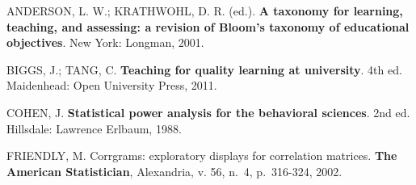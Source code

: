 \documentclass[
  12pt,
  a4paper,
  twoside,
  brazilian
]{article}
\begin{document}
ANDERSON, L. W.; KRATHWOHL, D. R. (ed.). \textbf{A taxonomy for learning,
teaching, and assessing: a revision of Bloom's taxonomy of educational
objectives}. New York: Longman, 2001.

BIGGS, J.; TANG, C. \textbf{Teaching for quality learning at university}.
4th ed. Maidenhead: Open University Press, 2011.

COHEN, J. \textbf{Statistical power analysis for the behavioral sciences}.
2nd ed. Hillsdale: Lawrence Erlbaum, 1988.

FRIENDLY, M. Corrgrams: exploratory displays for correlation matrices.
\textbf{The American Statistician}, Alexandria, v. 56, n.~4, p.~316-324, 2002.
\end{document}
